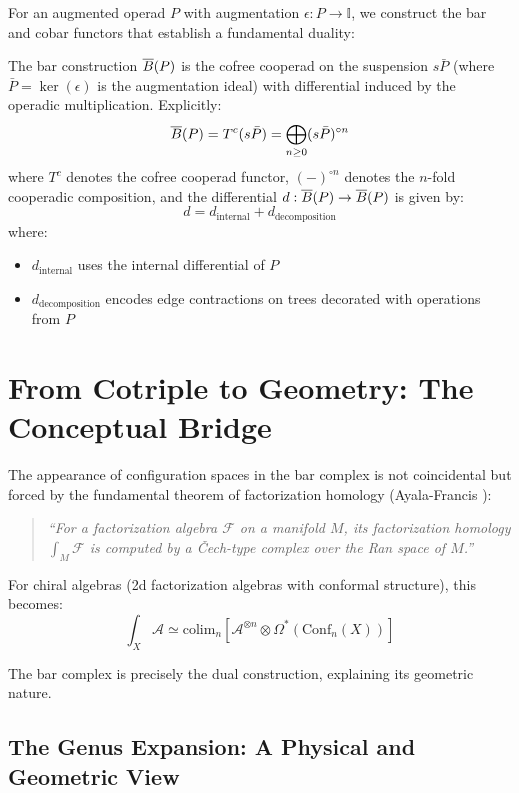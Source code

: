 For an augmented operad $P$ with augmentation $\epsilon : P \to \mathbb{I}$, we construct the bar and cobar functors that establish a fundamental duality:
 
\begin{definition}
The bar construction $\overline{B}(P)$ is the cofree cooperad on the suspension $s\bar{P}$ (where $\bar{P} = \ker(\epsilon)$ is the augmentation ideal) with differential induced by the operadic multiplication. Explicitly:
\[
\overline{B}(P) = T^c(s\bar{P}) = \bigoplus_{n \geq 0} (s\bar{P})^{\circ n}
\]
where $T^c$ denotes the cofree cooperad functor, $(-)^{\circ n}$ denotes the $n$-fold cooperadic composition,
and the differential $d: \overline{B}(P) \to \overline{B}(P)$ is given by:
\[
d = d_{\text{internal}} + d_{\text{decomposition}}
\]
where:
\begin{itemize}
\item $d_{\text{internal}}$ uses the internal differential of $P$
\item $d_{\text{decomposition}}$ encodes edge contractions on trees decorated with operations from $P$
\end{itemize}
\end{definition}

\section{From Cotriple to Geometry: The Conceptual Bridge}

\begin{remark}
The appearance of configuration spaces in the bar complex is not coincidental but forced by the 
fundamental theorem of factorization homology (Ayala-Francis \cite{AF}):

\begin{quote}
\emph{``For a factorization algebra $\mathcal{F}$ on a manifold $M$, its factorization homology 
$\int_M \mathcal{F}$ is computed by a Čech-type complex over the Ran space of $M$.''}
\end{quote}

For chiral algebras (2d factorization algebras with conformal structure), this becomes:
$$\int_X \mathcal{A} \simeq \text{colim}_{n} \left[ \mathcal{A}^{\otimes n} \otimes \Omega^*(\text{Conf}_n(X)) \right]$$

The bar complex is precisely the dual construction, explaining its geometric nature.
\end{remark}

\subsection{The Genus Expansion: A Physical and Geometric View}
\label{sec:genus_expansion_panorama}


